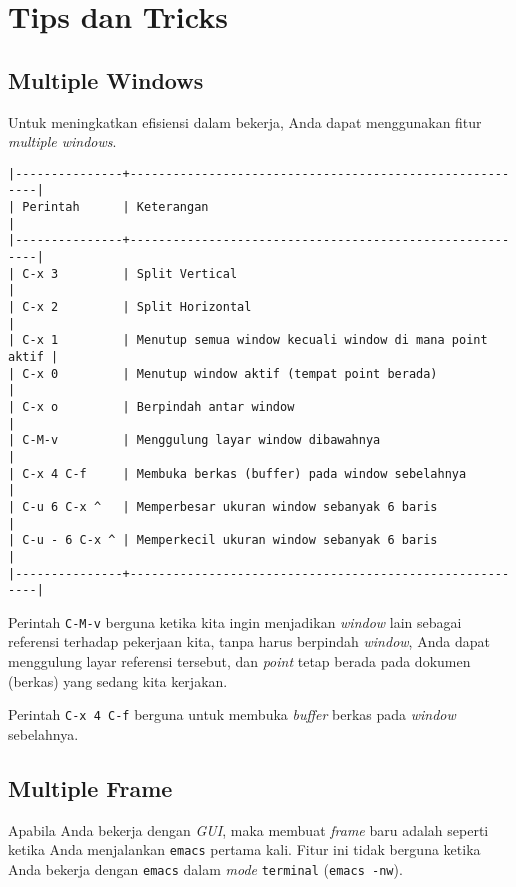 \documentclass{article}
\begin{document}
\section{Tips dan Tricks}

\subsection{Multiple Windows}
Untuk meningkatkan efisiensi dalam bekerja, Anda dapat menggunakan fitur
\emph{multiple windows}.

\begin{verbatim}
|---------------+---------------------------------------------------------|
| Perintah      | Keterangan                                              |
|---------------+---------------------------------------------------------|
| C-x 3         | Split Vertical                                          |
| C-x 2         | Split Horizontal                                        |
| C-x 1         | Menutup semua window kecuali window di mana point aktif |
| C-x 0         | Menutup window aktif (tempat point berada)              |
| C-x o         | Berpindah antar window                                  |
| C-M-v         | Menggulung layar window dibawahnya                      |
| C-x 4 C-f     | Membuka berkas (buffer) pada window sebelahnya          |
| C-u 6 C-x ^   | Memperbesar ukuran window sebanyak 6 baris              |
| C-u - 6 C-x ^ | Memperkecil ukuran window sebanyak 6 baris              |
|---------------+---------------------------------------------------------|
\end{verbatim}

Perintah \verb=C-M-v= berguna ketika kita ingin menjadikan \emph{window} lain
sebagai referensi terhadap pekerjaan kita, tanpa harus berpindah \emph{window},
Anda dapat menggulung layar referensi tersebut, dan \emph{point} tetap berada 
pada dokumen (berkas) yang sedang kita kerjakan.

Perintah \verb=C-x 4 C-f= berguna untuk membuka \emph{buffer} berkas pada
\emph{window} sebelahnya.

\subsection{Multiple Frame}
Apabila Anda bekerja dengan \emph{GUI}, maka membuat \emph{frame} baru adalah
seperti ketika Anda menjalankan \verb=emacs= pertama kali. Fitur ini tidak 
berguna ketika Anda bekerja dengan \verb=emacs= dalam \emph{mode} 
\verb=terminal= (\verb=emacs -nw=).
\end{document}

